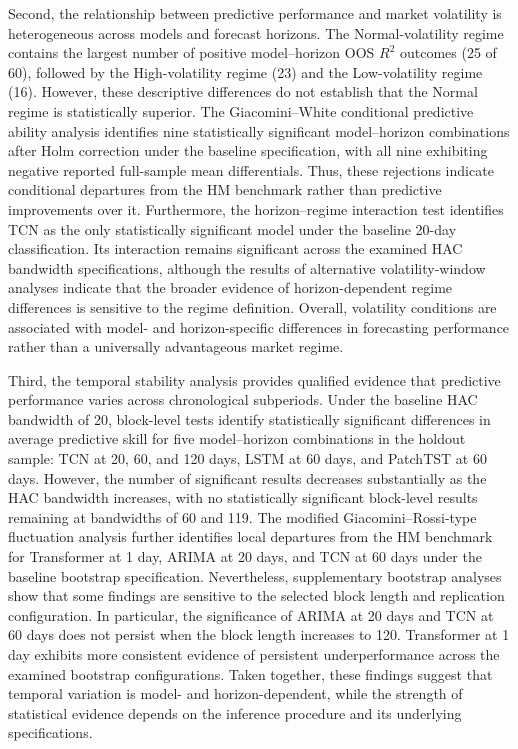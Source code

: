 \documentclass[runningheads,orivec]{llncs}
\begin{document}
Second, the relationship between predictive performance and market volatility is heterogeneous across models and forecast horizons. The Normal-volatility regime contains the largest number of positive model--horizon OOS $R^2$ outcomes (25 of 60), followed by the High-volatility regime (23) and the Low-volatility regime (16). However, these descriptive differences do not establish that the Normal regime is statistically superior. The Giacomini--White conditional predictive ability analysis identifies nine statistically significant model--horizon combinations after Holm correction under the baseline specification, with all nine exhibiting negative reported full-sample mean differentials. Thus, these rejections indicate conditional departures from the HM benchmark rather than predictive improvements over it. Furthermore, the horizon--regime interaction test identifies TCN as the only statistically significant model under the baseline 20-day classification. Its interaction remains significant across the examined HAC bandwidth specifications, although the results of alternative volatility-window analyses indicate that the broader evidence of horizon-dependent regime differences is sensitive to the regime definition. Overall, volatility conditions are associated with model- and horizon-specific differences in forecasting performance rather than a universally advantageous market regime.

Third, the temporal stability analysis provides qualified evidence that predictive performance varies across chronological subperiods. Under the baseline HAC bandwidth of 20, block-level tests identify statistically significant differences in average predictive skill for five model--horizon combinations in the holdout sample: TCN at 20, 60, and 120 days, LSTM at 60 days, and PatchTST at 60 days. However, the number of significant results decreases substantially as the HAC bandwidth increases, with no statistically significant block-level results remaining at bandwidths of 60 and 119. The modified Giacomini--Rossi-type fluctuation analysis further identifies local departures from the HM benchmark for Transformer at 1 day, ARIMA at 20 days, and TCN at 60 days under the baseline bootstrap specification. Nevertheless, supplementary bootstrap analyses show that some findings are sensitive to the selected block length and replication configuration. In particular, the significance of ARIMA at 20 days and TCN at 60 days does not persist when the block length increases to 120. Transformer at 1 day exhibits more consistent evidence of persistent underperformance across the examined bootstrap configurations. Taken together, these findings suggest that temporal variation is model- and horizon-dependent, while the strength of statistical evidence depends on the inference procedure and its underlying specifications.
\end{document}
